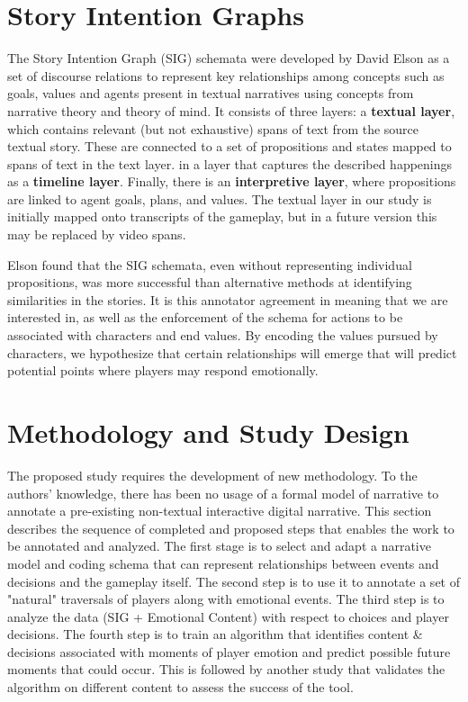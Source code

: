\section{Story Intention Graphs}
\label{sec:orgheadline4}
The Story Intention Graph (SIG) schemata were developed by David Elson
as a set of discourse relations to represent key relationships among
concepts such as goals, values and agents present in textual
narratives using concepts from narrative theory and theory of mind. It
consists of three layers: a \textbf{textual layer}, which contains relevant
(but not exhaustive) spans of text from the source textual
story. These are connected to a set of propositions and states mapped
to spans of text in the text layer. in a layer that captures the
described happenings as a \textbf{timeline layer}. Finally, there is an
\textbf{interpretive layer}, where propositions are linked to agent goals,
plans, and values. The textual layer in our study is initially mapped
onto transcripts of the gameplay, but in a future version this may be
replaced by video spans.

Elson found that the SIG schemata, even without representing
individual propositions, was more successful than alternative methods
at identifying similarities in the stories. It is this annotator
agreement in meaning that we are interested in, as well as the
enforcement of the schema for actions to be associated with characters
and end values. By encoding the values pursued by characters, we
hypothesize that certain relationships will emerge that will predict
potential points where players may respond emotionally.

\section{Methodology and Study Design}
\label{sec:orgheadline8}
The proposed study requires the development of new methodology. To the
authors' knowledge, there has been no usage of a formal model of
narrative to annotate a pre-existing non-textual interactive digital
narrative. This section describes the sequence of completed and
proposed steps that enables the work to be annotated and analyzed. The
first stage is to select and adapt a narrative model and coding schema
that can represent relationships between events and decisions and the
gameplay itself. The second step is to use it to annotate a set of
"natural" traversals of players along with emotional events. The third
step is to analyze the data (SIG + Emotional Content) with respect to
choices and player decisions. The fourth step is to train an algorithm
that identifies content \& decisions associated with moments of player
emotion and predict possible future moments that could occur.  This is
followed by another study that validates the algorithm on different
content to assess the success of the tool.

